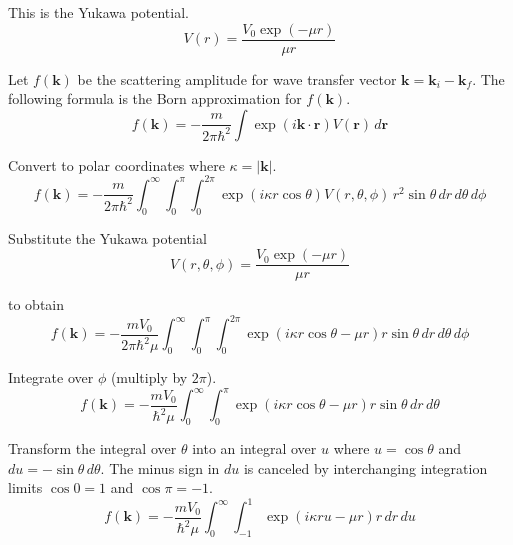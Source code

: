 


This is the Yukawa potential.
\begin{equation*}
V(r)=\frac{V_0\exp(-\mu r)}{\mu r}
\tag{10.35}
\end{equation*}

Let $f(\mathbf k)$ be the scattering amplitude for wave transfer vector
$\mathbf k=\mathbf k_i-\mathbf k_f$.
The following formula is the Born approximation for $f(\mathbf k)$.
\begin{equation*}
f(\mathbf k)
=-\frac{m}{2\pi\hbar^2}
\int\exp(i\mathbf k\cdot\mathbf r)V(\mathbf r)\,d\mathbf r
\end{equation*}

Convert to polar coordinates where $\kappa=|\mathbf k|$.
\begin{equation*}
f(\mathbf k)
=-\frac{m}{2\pi\hbar^2}
\int_0^\infty
\int_0^\pi
\int_0^{2\pi}
\exp(i\kappa r\cos\theta)V(r,\theta,\phi)
\,r^2\sin\theta\,dr\,d\theta\,d\phi
\end{equation*}

Substitute the Yukawa potential
\begin{equation*}
V(r,\theta,\phi)=\frac{V_0\exp(-\mu r)}{\mu r}
\end{equation*}

to obtain
\begin{equation*}
f(\mathbf k)
=-\frac{mV_0}{2\pi\hbar^2\mu}
\int_0^\infty
\int_0^\pi
\int_0^{2\pi}
\exp(i\kappa r\cos\theta-\mu r)
r\sin\theta\,dr\,d\theta\,d\phi
\end{equation*}

Integrate over $\phi$ (multiply by $2\pi$).
\begin{equation*}
f(\mathbf k)
=-\frac{mV_0}{\hbar^2\mu}
\int_0^\infty
\int_0^\pi
\exp(i\kappa r\cos\theta-\mu r)
r\sin\theta\,dr\,d\theta
\end{equation*}

Transform the integral over $\theta$ into an integral over $u$
where $u=\cos\theta$ and $du=-\sin\theta\,d\theta$.
The minus sign in $du$ is canceled by interchanging integration limits
$\cos0=1$ and $\cos\pi=-1$.
\begin{equation*}
f(\mathbf k)
=-\frac{mV_0}{\hbar^2\mu}
\int_0^\infty
\int_{-1}^1
\exp(i\kappa ru-\mu r)
r\,dr\,du
\end{equation*}

